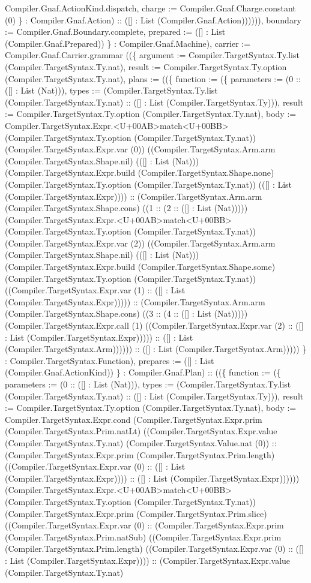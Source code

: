 \documentclass[11pt]{article}
\begin{document}
Compiler.Gnaf.ActionKind.dispatch, charge := Compiler.Gnaf.Charge.constant (0) \} : Compiler.Gnaf.Action) :: ([] : List (Compiler.Gnaf.Action)))))), boundary := Compiler.Gnaf.Boundary.complete, prepared := ([] : List (Compiler.Gnaf.Prepared)) \} : Compiler.Gnaf.Machine), carrier := Compiler.Gnaf.Carrier.grammar ((\{ argument := Compiler.TargetSyntax.Ty.list (Compiler.TargetSyntax.Ty.nat), result := Compiler.TargetSyntax.Ty.option (Compiler.TargetSyntax.Ty.nat), plans := ((\{ function := (\{ parameters := (0 :: ([] : List (Nat))), types := (Compiler.TargetSyntax.Ty.list (Compiler.TargetSyntax.Ty.nat) :: ([] : List (Compiler.TargetSyntax.Ty))), result := Compiler.TargetSyntax.Ty.option (Compiler.TargetSyntax.Ty.nat), body := Compiler.TargetSyntax.Expr.<U+00AB>match<U+00BB> (Compiler.TargetSyntax.Ty.option (Compiler.TargetSyntax.Ty.nat)) (Compiler.TargetSyntax.Expr.var (0)) ((Compiler.TargetSyntax.Arm.arm (Compiler.TargetSyntax.Shape.nil) (([] : List (Nat))) (Compiler.TargetSyntax.Expr.build (Compiler.TargetSyntax.Shape.none) (Compiler.TargetSyntax.Ty.option (Compiler.TargetSyntax.Ty.nat)) (([] : List (Compiler.TargetSyntax.Expr)))) :: (Compiler.TargetSyntax.Arm.arm (Compiler.TargetSyntax.Shape.cons) ((1 :: (2 :: ([] : List (Nat))))) (Compiler.TargetSyntax.Expr.<U+00AB>match<U+00BB> (Compiler.TargetSyntax.Ty.option (Compiler.TargetSyntax.Ty.nat)) (Compiler.TargetSyntax.Expr.var (2)) ((Compiler.TargetSyntax.Arm.arm (Compiler.TargetSyntax.Shape.nil) (([] : List (Nat))) (Compiler.TargetSyntax.Expr.build (Compiler.TargetSyntax.Shape.some) (Compiler.TargetSyntax.Ty.option (Compiler.TargetSyntax.Ty.nat)) ((Compiler.TargetSyntax.Expr.var (1) :: ([] : List (Compiler.TargetSyntax.Expr))))) :: (Compiler.TargetSyntax.Arm.arm (Compiler.TargetSyntax.Shape.cons) ((3 :: (4 :: ([] : List (Nat))))) (Compiler.TargetSyntax.Expr.call (1) ((Compiler.TargetSyntax.Expr.var (2) :: ([] : List (Compiler.TargetSyntax.Expr))))) :: ([] : List (Compiler.TargetSyntax.Arm)))))) :: ([] : List (Compiler.TargetSyntax.Arm))))) \} : Compiler.TargetSyntax.Function), prepares := ([] : List (Compiler.Gnaf.ActionKind)) \} : Compiler.Gnaf.Plan) :: ((\{ function := (\{ parameters := (0 :: ([] : List (Nat))), types := (Compiler.TargetSyntax.Ty.list (Compiler.TargetSyntax.Ty.nat) :: ([] : List (Compiler.TargetSyntax.Ty))), result := Compiler.TargetSyntax.Ty.option (Compiler.TargetSyntax.Ty.nat), body := Compiler.TargetSyntax.Expr.cond (Compiler.TargetSyntax.Expr.prim (Compiler.TargetSyntax.Prim.natLt) ((Compiler.TargetSyntax.Expr.value (Compiler.TargetSyntax.Ty.nat) (Compiler.TargetSyntax.Value.nat (0)) :: (Compiler.TargetSyntax.Expr.prim (Compiler.TargetSyntax.Prim.length) ((Compiler.TargetSyntax.Expr.var (0) :: ([] : List (Compiler.TargetSyntax.Expr)))) :: ([] : List (Compiler.TargetSyntax.Expr)))))) (Compiler.TargetSyntax.Expr.<U+00AB>match<U+00BB> (Compiler.TargetSyntax.Ty.option (Compiler.TargetSyntax.Ty.nat)) (Compiler.TargetSyntax.Expr.prim (Compiler.TargetSyntax.Prim.slice) ((Compiler.TargetSyntax.Expr.var (0) :: (Compiler.TargetSyntax.Expr.prim (Compiler.TargetSyntax.Prim.natSub) ((Compiler.TargetSyntax.Expr.prim (Compiler.TargetSyntax.Prim.length) ((Compiler.TargetSyntax.Expr.var (0) :: ([] : List (Compiler.TargetSyntax.Expr)))) :: (Compiler.TargetSyntax.Expr.value (Compiler.TargetSyntax.Ty.nat) 
\end{document}
